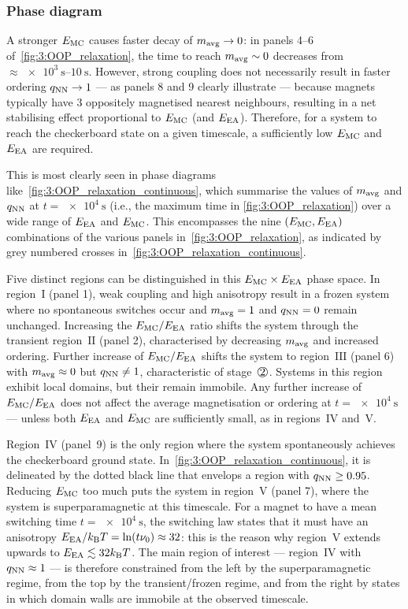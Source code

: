 \subsubsection{Phase diagram}
A stronger  $E_\mathrm{MC}$ causes faster decay of $m_\mathrm{avg} \rightarrow 0$: in panels 4--6 of~\cref{fig:3:OOP_relaxation}, the time to reach $m_\mathrm{avg} \sim 0$ decreases from $\approx \SIrange{e3}{10}{\second}$.
However, strong coupling does not necessarily result in faster ordering $q_\mathrm{NN} \rightarrow 1$ --- as panels 8 and 9 clearly illustrate --- because  magnets typically have 3 oppositely magnetised nearest neighbours, resulting in a net stabilising effect proportional to $E_\mathrm{MC}$ (and $E_\mathrm{EA}$).
Therefore, for a system to reach the checkerboard state on a given timescale, a sufficiently low $E_\mathrm{MC}$ and $E_\mathrm{EA}$ are required. \par
This is most clearly seen in phase diagrams like~\cref{fig:3:OOP_relaxation_continuous}, which summarise the values of $m_\mathrm{avg}$ and $q_\mathrm{NN}$ at $t = \SI{e4}{\second}$ (i.e., the maximum time in \cref{fig:3:OOP_relaxation}) over a wide range of $E_\mathrm{EA}$ and $E_\mathrm{MC}$.
This encompasses the nine $(E_\mathrm{MC},E_\mathrm{EA})$ combinations of the various panels in~\cref{fig:3:OOP_relaxation}, as indicated by grey numbered crosses in~\cref{fig:3:OOP_relaxation_continuous}. \par
Five distinct regions can be distinguished in this $E_\mathrm{MC} \times E_\mathrm{EA}$ phase space.
In region~$\mathrm{I}$ (panel 1), weak coupling and high anisotropy result in a frozen system where no spontaneous switches occur and $m_\mathrm{avg} = 1$ and $q_\mathrm{NN} = 0$ remain unchanged.
Increasing the $E_\mathrm{MC}/E_\mathrm{EA}$ ratio shifts the system through the transient region~$\mathrm{II}$ (panel 2), characterised by decreasing $m_\mathrm{avg}$ and increased ordering.
Further increase of $E_\mathrm{MC}/E_\mathrm{EA}$ shifts the system to region~$\mathrm{III}$ (panel 6) with $m_\mathrm{avg} \approx 0$ but $q_\mathrm{NN} \neq 1$, characteristic of stage~$\circled{2}$.
Systems in this region exhibit local domains, but their  remain immobile.
Any further increase of $E_\mathrm{MC}/E_\mathrm{EA}$ does not affect the average magnetisation or ordering at $t = \SI{e4}{\second}$ --- unless both $E_\mathrm{EA}$ and $E_\mathrm{MC}$ are sufficiently small, as in regions~$\mathrm{IV}$ and~$\mathrm{V}$. \par
Region~$\mathrm{IV}$ (panel~9) is the only region where the system spontaneously achieves the checkerboard ground state.
In~\cref{fig:3:OOP_relaxation_continuous}, it is delineated by the dotted black line that envelops a region with $q_\mathrm{NN} \geq 0.95$.
Reducing $E_\mathrm{MC}$ too much puts the system in region~$\mathrm{V}$ (panel 7), where the system is superparamagnetic at this timescale.
For a magnet to have a mean switching time $t = \SI{e4}{\second}$, the  switching law states that it must have an anisotropy $\EEA/\kBT = \ln(t \nu_0) \approx 32$: this is the reason why region~$\mathrm{V}$ extends upwards to $\EEA \lesssim 32 \kBT$.
The main region of interest --- region~$\mathrm{IV}$ with $q_\mathrm{NN} \approx 1$ --- is therefore constrained from the left by the superparamagnetic regime, from the top by the transient/frozen regime, and from the right by states in which domain walls are immobile at the observed timescale.

